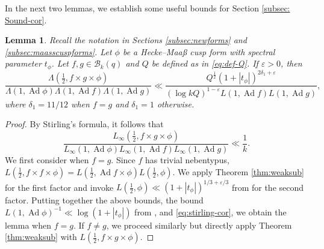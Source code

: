 \documentclass[12pt,reqno]{amsart}
\newtheorem{lem}[thm]{Lemma}
\theoremstyle{remark}
\DeclareMathOperator{\ad}{Ad}
\numberwithin{equation}{section}
\begin{document}
In the next two lemmas, we establish some useful bounds for Section \ref{subsec: Sound-cor}.  

\begin{lem}\label{lem:bound-Lambda-Maass}
 Recall the notation in Sections \ref{subsec:newforms} and \ref{subsec:maasscuspforms}. Let $\phi$ be a Hecke--Maa{\ss} cusp form with spectral parameter $t_\phi $. Let $f,g \in \mathcal{B}_k(q)$ and $Q$ be defined as in \eqref{eq:def-Q}. If $\varepsilon > 0$, then
\begin{equation*}
    \frac{\Lambda(\tfrac{1}{2}, f\times g \times \phi)}{\Lambda(1,\ad \phi)\Lambda(1, \ad f)\Lambda(1, \ad g)} \ll \frac{Q^{\frac{1}{2}}(1+|t_\phi|)^{2\delta_1+\varepsilon}}{(\log kQ)^{1-\varepsilon}L(1,\ad f)L(1,\ad g)},
\end{equation*}
where $\delta_1 = 11/12$ when $f=g$ and $\delta_1 = 1$ otherwise.
\end{lem}

\begin{proof}
    By Stirling's formula, it follows that 
    \begin{equation}\label{eq:stirling-cor}
     \frac{L_\infty(\tfrac{1}{2}, f \times g \times \phi)}{L_\infty(1, \ad \phi) L_\infty(1,\ad f) L_\infty(1,\ad g)} 
        \ll \frac{1}{k}.
    \end{equation}
We first consider when $f = g$. Since $f$ has trivial nebentypus, $L(\frac{1}{2}, f \times {f} \times \phi) = L(\frac{1}{2}, \ad f\times \phi)L(\frac{1}{2}, \phi)$. We apply Theorem \ref{thm:weaksub} for the first factor and invoke  $L(\frac{1}{2}, \phi) \ll  (1+|t_\phi|) ^{1/3+\varepsilon/3}$ from \cite[Corollary 2]{I} for the second factor.
Putting together the above bounds, the bound $L(1,\ad \phi)^{-1} \ll \log(1+|t_\phi|)$ from \cite{HJLP}, and \eqref{eq:stirling-cor}, we obtain the lemma when $f=g$.
If $f \neq g$, we proceed similarly but directly apply Theorem \ref{thm:weaksub} with $L(\frac{1}{2}, f \times g \times \phi)$.
    \end{proof}
   
   
\end{document}
